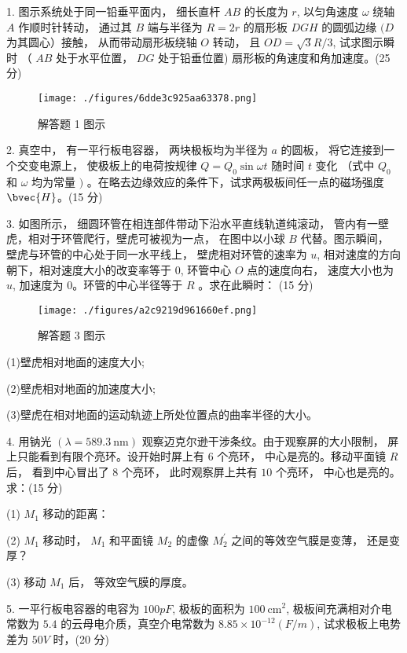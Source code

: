 
1. 图示系统处于同一铅垂平面内， 细长直杆 $A B$ 的长度为 $r$, 以匀角速度 $\omega$ 绕轴 $A$ 作顺时针转动， 通过其 $B$ 端与半径为 $R=2 r$ 的扇形板 $D G H$ 的圆弧边缘 $(D$ 为其圆心）接触， 从而带动扇形板绕轴 $O$ 转动， 且 $O D=\sqrt{3} R / 3$, 试求图示瞬时 （ $A B$ 处于水平位置， $D G$ 处于铅垂位置) 扇形板的角速度和角加速度。(25 分)

\begin{figure}[ht]
\centering
\texttt{[image: ./figures/6dde3c925aa63378.png]}
\caption{解答题 1 图示} \label{fig_FDU15_1}
\end{figure}

2. 真空中， 有一平行板电容器， 两块极板均为半径为 $a$ 的圆板， 将它连接到一个交变电源上， 使极板上的电荷按规律 $Q=Q_{0} \sin \omega t$ 随时间 $t$ 变化 （式中 $Q_{0}$ 和 $\omega$ 均为常量 $)$ 。在略去边缘效应的条件下，试求两极板间任一点的磁场强度 $\bvec{H}$。(15 分)

3. 如图所示， 细圆环管在相连部件带动下沿水平直线轨道纯滚动， 管内有一壁虎，相对于环管爬行，壁虎可被视为一点， 在图中以小球 $B$ 代替。图示瞬间， 壁虎与环管的中心处于同一水平线上， 壁虎相对环管的速率为 $u$, 相对速度的方向朝下，相对速度大小的改变率等于 $0$, 环管中心 $O$ 点的速度向右， 速度大小也为 $u$, 加速度为 $0$。环管的中心半径等于 $R$ 。求在此瞬时：
(15 分)

\begin{figure}[ht]
\centering
\texttt{[image: ./figures/a2c9219d961660ef.png]}
\caption{解答题 3 图示} \label{fig_FDU15_2}
\end{figure}

(1)壁虎相对地面的速度大小;

(2)壁虎相对地面的加速度大小;

(3)壁虎在相对地面的运动轨迹上所处位置点的曲率半径的大小。

4. 用钠光 $(\lambda=589.3 \mathrm{~nm})$ 观察迈克尔逊干涉条纹。由于观察屏的大小限制， 屏上只能看到有限个亮环。设开始时屏上有 $6$ 个亮环， 中心是亮的。移动平面镜 $R$ 后， 看到中心冒出了 $8$ 个亮环， 此时观察屏上共有 $10$ 个亮环， 中心也是亮的。求：(15 分)

(1) $M_{1}$ 移动的距离：

(2) $M_{1}$ 移动时， $M_{1}$ 和平面镜 $M_{2}$ 的虚像 $M_{2}^{\prime}$ 之间的等效空气膜是变薄， 还是变厚？

(3) 移动 $M_{1}$ 后， 等效空气膜的厚度。

5. 一平行板电容器的电容为 $100 p F$, 极板的面积为 $100 \mathrm{~cm}^{2}$, 极板间充满相对介电常数为 $5.4$ 的云母电介质，真空介电常数为 $8.85 \times 10^{-12}(F / m)$, 试求极板上电势差为 $50 V$ 时，(20 分)

